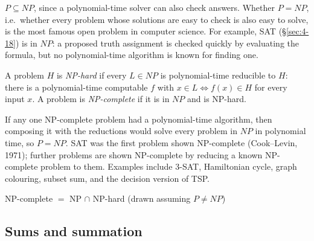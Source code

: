 \begin{note}[P vs.\ NP (extra)]
$P\subseteq NP$, since a polynomial-time solver can also check answers. Whether $P=NP$, i.e.\ whether every problem whose solutions are easy to check is also easy to solve, is the most famous open problem in computer science. For example, SAT (\S\ref{sec:4-18}) is in $NP$: a proposed truth assignment is checked quickly by evaluating the formula, but no polynomial-time algorithm is known for finding one.
\end{note}

\begin{definition}
A problem $H$ is \emph{NP-hard} if every $L\in NP$ is polynomial-time reducible to $H$: there is a polynomial-time computable $f$ with $x\in L \iff f(x)\in H$ for every input $x$. A problem is \emph{NP-complete} if it is in $NP$ and is NP-hard.
\end{definition}

\begin{note}
If any one NP-complete problem had a polynomial-time algorithm, then composing it with the reductions would solve every problem in $NP$ in polynomial time, so $P=NP$. SAT was the first problem shown NP-complete (Cook--Levin, 1971); further problems are shown NP-complete by reducing a known NP-complete problem to them. Examples include $3$-SAT, Hamiltonian cycle, graph colouring, subset sum, and the decision version of TSP.
\end{note}

\begin{center}
\end{center}
\begin{center}
\small NP-complete $=$ NP $\cap$ NP-hard (drawn assuming $P\ne NP$)
\end{center}

\subsection{Sums and summation}
\label{sec:6-10}

